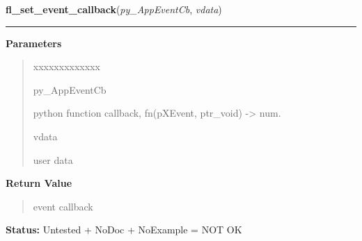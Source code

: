 \hspace{.8\funcindent}\begin{boxedminipage}{\funcwidth}

    \raggedright \textbf{fl\_set\_event\_callback}(\textit{py\_AppEventCb}, \textit{vdata})

    \vspace{-1.5ex}

    \rule{\textwidth}{0.5\fboxrule}
\setlength{\parskip}{2ex}
\setlength{\parskip}{1ex}
      \textbf{Parameters}
      \vspace{-1ex}

      \begin{quote}
        \begin{Ventry}{xxxxxxxxxxxxx}

          \item[py\_AppEventCb]

          python function callback, fn(pXEvent, ptr\_void) -{\textgreater} 
          num.

          \item[vdata]

          user data

        \end{Ventry}

      \end{quote}

      \textbf{Return Value}
    \vspace{-1ex}

      \begin{quote}
      event callback

      \end{quote}

\textbf{Status:} Untested + NoDoc + NoExample = NOT OK



    \end{boxedminipage}

    \label{xformslib:library:fl_set_idle_callback}

    \vspace{0.5ex}

